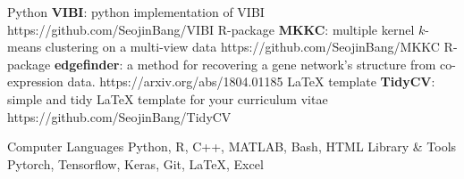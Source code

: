 \documentclass{tidycv} %
\begin{document}
\begin{cvsoftwares}
  \cvsoftware
  {Python} %
  {{\bf VIBI}: python implementation of VIBI} %
  {https://github.com/SeojinBang/VIBI} %
  \cvsoftware
  {R-package} %
  {{\bf MKKC}: multiple kernel $k$-means clustering on a multi-view data} %
  {https://github.com/SeojinBang/MKKC} %
  \cvsoftware
  {R-package} %
  {{\bf edgefinder}: a method for recovering a gene network’s structure from co-expression data.} %
  {https://arxiv.org/abs/1804.01185} %
  \cvsoftware
  {LaTeX template} %
  {{\bf TidyCV}: simple and tidy LaTeX template for your curriculum vitae} %
  {https://github.com/SeojinBang/TidyCV} %
\end{cvsoftwares}

\begin{cvtechnicalstrengths}
  \cvtechnicalstrength
  {Computer Languages} %
  {Python, R, C++, MATLAB, Bash, HTML} %
  \cvtechnicalstrength
  {Library \& Tools} %
  {Pytorch, Tensorflow, Keras, Git, LaTeX, Excel} %
\end{cvtechnicalstrengths}
\end{document}
